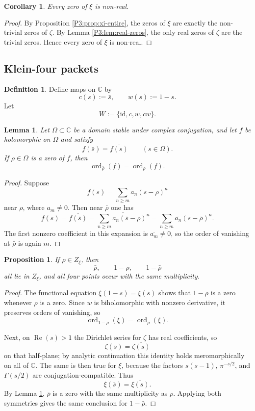 \documentclass[11pt,a4paper]{article}
\numberwithin{equation}{section}
\newtheorem{proposition}[theorem]{Proposition}
\newtheorem{lemma}[theorem]{Lemma}
\newtheorem{corollary}[theorem]{Corollary}
\theoremstyle{definition}
\newtheorem{definition}[theorem]{Definition}
\theoremstyle{remark}
\DeclareMathOperator{\ord}{ord}
\DeclareMathOperator{\Rea}{Re}
\newcommand{\CC}{\mathbb C}
\begin{document}
\begin{corollary}\label{P3:cor:nonreal}
Every zero of $\xi$ is non-real.
\end{corollary}

\begin{proof}
By Proposition \ref{P3:prop:xi-entire}, the zeros of $\xi$ are exactly the non-trivial zeros of $\zeta$.  By Lemma \ref{P3:lem:real-zeros}, the only real zeros of $\zeta$ are the trivial zeros.  Hence every zero of $\xi$ is non-real.
\end{proof}

\subsection{Klein-four packets}

\begin{definition}
Define maps on $\CC$ by
\[
c(s):=\bar s,
\qquad
w(s):=1-s.
\]
Let
\[
W:=\{\mathrm{id},c,w,cw\}.
\]
\end{definition}

\begin{lemma}\label{P3:lem:conjugate-order}
Let $\Omega\subset\CC$ be a domain stable under complex conjugation, and let $f$ be holomorphic on $\Omega$ and satisfy
\[
f(\bar s)=\overline{f(s)}
\qquad (s\in \Omega).
\]
If $\rho\in\Omega$ is a zero of $f$, then
\[
\ord_{\bar\rho}(f)=\ord_\rho(f).
\]
\end{lemma}

\begin{proof}
Suppose
\[
f(s)=\sum_{n\ge m} a_n (s-\rho)^n
\]
near $\rho$, where $a_m\ne 0$.  Then near $\bar\rho$ one has
\[
f(s)=\overline{f(\bar s)}=
\overline{\sum_{n\ge m} a_n (\bar s-\rho)^n}
=
\sum_{n\ge m} \overline{a_n}(s-\bar\rho)^n.
\]
The first nonzero coefficient in this expansion is $\overline{a_m}\ne 0$, so the order of vanishing at $\bar\rho$ is again $m$.
\end{proof}

\begin{proposition}\label{P3:prop:packet-symmetry}
If $\rho\in Z_\xi$, then
\[
\bar\rho,\qquad 1-\rho,\qquad 1-\bar\rho
\]
all lie in $Z_\xi$, and all four points occur with the same multiplicity.
\end{proposition}

\begin{proof}
The functional equation $\xi(1-s)=\xi(s)$ shows that $1-\rho$ is a zero whenever $\rho$ is a zero.  Since $w$ is biholomorphic with nonzero derivative, it preserves orders of vanishing, so
\[
\ord_{1-\rho}(\xi)=\ord_\rho(\xi).
\]

Next, on $\Rea(s)>1$ the Dirichlet series for $\zeta$ has real coefficients, so
\[
\zeta(\bar s)=\overline{\zeta(s)}
\]
on that half-plane; by analytic continuation this identity holds meromorphically on all of $\CC$.  The same is then true for $\xi$, because the factors $s(s-1)$, $\pi^{-s/2}$, and $\Gamma(s/2)$ are conjugation-compatible.  Thus
\[
\xi(\bar s)=\overline{\xi(s)}.
\]
By Lemma \ref{P3:lem:conjugate-order}, $\bar\rho$ is a zero with the same multiplicity as $\rho$.  Applying both symmetries gives the same conclusion for $1-\bar\rho$.
\end{proof}
\end{document}
